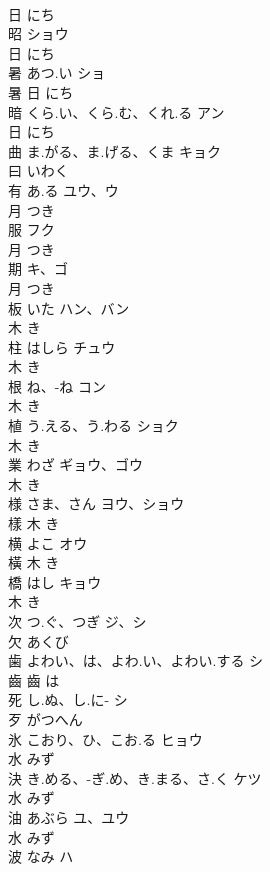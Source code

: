 \documentclass[8pt]{extreport}
\begin{document}
\begin{CJK}{UTF8}{min}
\\	日		にち		
\\	昭		ショウ	
\\	日		にち		
\\	暑	あつ.い	ショ	
\\	暑	日		にち		
\\	暗	くら.い、くら.む、くれ.る	アン	
\\	日		にち		
\\	曲	ま.がる、ま.げる、くま	キョク	
\\	曰		いわく		
\\	有	あ.る	ユウ、ウ	
\\	月		つき		
\\	服		フク	
\\	月		つき		
\\	期		キ、ゴ	
\\	月		つき		
\\	板	いた	ハン、バン	
\\	木		き		
\\	柱	はしら	チュウ	
\\	木		き		
\\	根	ね、-ね	コン	
\\	木		き		
\\	植	う.える、う.わる	ショク	
\\	木		き		
\\	業	わざ	ギョウ、ゴウ	
\\	木		き		
\\	様	さま、さん	ヨウ、ショウ	
\\	樣	木		き		
\\	横	よこ	オウ	
\\	橫	木		き		
\\	橋	はし	キョウ	
\\	木		き		
\\	次	つ.ぐ、つぎ	ジ、シ	
\\	欠		あくび		
\\	歯	よわい、は、よわ.い、よわい.する	シ	
\\	齒	齒		は		
\\	死	し.ぬ、し.に-	シ	
\\	歹		がつへん		
\\	氷	こおり、ひ、こお.る	ヒョウ	
\\	水		みず		
\\	決	き.める、-ぎ.め、き.まる、さ.く	ケツ	
\\	水		みず		
\\	油	あぶら	ユ、ユウ	
\\	水		みず		
\\	波	なみ	ハ	

\end{CJK}
\end{document}
